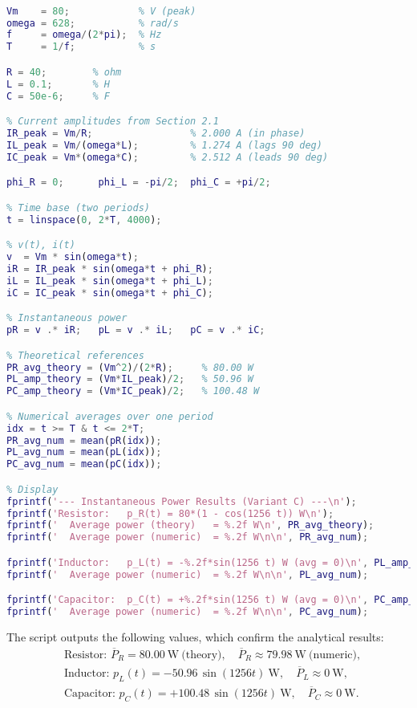 \documentclass{article}
\begin{document}
\begin{lstlisting}[language=Matlab]
% exercise2_2_power.m  -- Instantaneous power for R, L, C (Variant C)

Vm    = 80;            % V (peak)
omega = 628;           % rad/s
f     = omega/(2*pi);  % Hz
T     = 1/f;           % s

R = 40;        % ohm
L = 0.1;       % H
C = 50e-6;     % F

% Current amplitudes from Section 2.1
IR_peak = Vm/R;                 % 2.000 A (in phase)
IL_peak = Vm/(omega*L);         % 1.274 A (lags 90 deg)
IC_peak = Vm*(omega*C);         % 2.512 A (leads 90 deg)

phi_R = 0;      phi_L = -pi/2;  phi_C = +pi/2;

% Time base (two periods)
t = linspace(0, 2*T, 4000);

% v(t), i(t)
v  = Vm * sin(omega*t);
iR = IR_peak * sin(omega*t + phi_R);
iL = IL_peak * sin(omega*t + phi_L);
iC = IC_peak * sin(omega*t + phi_C);

% Instantaneous power
pR = v .* iR;   pL = v .* iL;   pC = v .* iC;

% Theoretical references
PR_avg_theory = (Vm^2)/(2*R);     % 80.00 W
PL_amp_theory = (Vm*IL_peak)/2;   % 50.96 W
PC_amp_theory = (Vm*IC_peak)/2;   % 100.48 W

% Numerical averages over one period
idx = t >= T & t <= 2*T;
PR_avg_num = mean(pR(idx));
PL_avg_num = mean(pL(idx));
PC_avg_num = mean(pC(idx));

% Display
fprintf('--- Instantaneous Power Results (Variant C) ---\n');
fprintf('Resistor:   p_R(t) = 80*(1 - cos(1256 t)) W\n');
fprintf('  Average power (theory)   = %.2f W\n', PR_avg_theory);
fprintf('  Average power (numeric)  = %.2f W\n\n', PR_avg_num);

fprintf('Inductor:   p_L(t) = -%.2f*sin(1256 t) W (avg = 0)\n', PL_amp_theory);
fprintf('  Average power (numeric)  = %.2f W\n\n', PL_avg_num);

fprintf('Capacitor:  p_C(t) = +%.2f*sin(1256 t) W (avg = 0)\n', PC_amp_theory);
fprintf('  Average power (numeric)  = %.2f W\n\n', PC_avg_num);
\end{lstlisting}

The script outputs the following values, which confirm the analytical results:
\[
\begin{aligned}
&\text{Resistor: } \overline P_R = 80.00~\text{W} \ \text{(theory)},\quad
\overline P_R \approx 79.98~\text{W} \ \text{(numeric)},\\[4pt]
&\text{Inductor: } p_L(t) = -50.96\,\sin(1256t)\ \text{W},\quad
\overline P_L \approx 0~\text{W},\\[4pt]
&\text{Capacitor: } p_C(t) = +100.48\,\sin(1256t)\ \text{W},\quad
\overline P_C \approx 0~\text{W}.
\end{aligned}
\]
\end{document}
